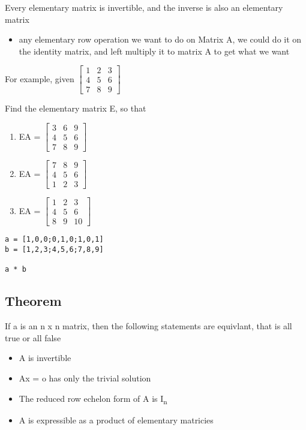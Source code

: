 \documentclass[11pt]{article}
\begin{document}
Every elementary matrix is invertible, and the inverse is also an elementary matrix
\begin{itemize}
\item any elementary row operation we want to do on Matrix A, we could do it on the identity matrix, and left multiply it to matrix A to get what we want
\end{itemize}

For example, given \(\begin{bmatrix}1&2&3\\4&5&6\\7&8&9\end{bmatrix}\)

Find the elementary matrix E, so that
\begin{enumerate}
\item EA = \(\begin{bmatrix}3 & 6 & 9 \\ 4 & 5 & 6 \\ 7 & 8 & 9\end{bmatrix}\)
\item EA = \(\begin{bmatrix}7&8&9\\4&5&6\\1&2&3\end{bmatrix}\)
\item EA = \(\begin{bmatrix}1&2&3\\4&5&6\\8&9&10\end{bmatrix}\)
\end{enumerate}

\begin{verbatim}
a = [1,0,0;0,1,0;1,0,1]
b = [1,2,3;4,5,6;7,8,9]

a * b
\end{verbatim}
\subsection{Theorem}
\label{sec:org7f5ccfd}
If a is an n x n matrix, then the following statements are equivlant, that is all true or all false
\begin{itemize}
\item A is invertible
\item Ax = o has only the trivial solution
\item The reduced row echelon form of A is I\textsubscript{n}
\item A is expressible as a product of elementary matricies
\end{itemize}
\end{document}
